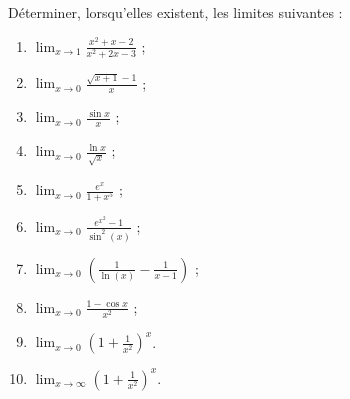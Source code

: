 
\begin{exercice}[\minsyndical]\label{exoTD2-1}
  
Déterminer, lorsqu'elles existent, les limites suivantes :
\begin{enumerate}
  \item
    $\displaystyle \lim_{x\to 1}\frac{x^2+x-2}{x^2+2x-3}$ ;
    \item
      $\displaystyle \lim_{x\to 0}\frac{\sqrt{x+1}-1}{x}$ ;
      \item
        $\displaystyle \lim_{x\to 0}\frac{\sin x}{x}$ ;
        \item
          $\displaystyle \lim_{x\to 0}\frac{\ln x}{\sqrt{x}}$ ;
          \item
            $\displaystyle \lim_{x\to 0}\frac{e^x}{1+x^5}$ ;
            \item
              $\displaystyle \lim_{x\to 0}\frac{e^{x^2}-1}{\sin^2 (x)}$ ;
              \item
                $\displaystyle \lim_{x\to 0}\left(\frac{1}{\ln (x)}-\frac{1}{x-1}\right)$ ;
    \item
        $\displaystyle \lim_{x\to 0}\frac{1-\cos x}{x^2}$ ;
    \item
        $\displaystyle \lim_{x\to 0}\left(1+ \frac{1}{x^2}\right)^x$. 
    \item   \label{ExobgEPck}
        $\displaystyle \lim_{x\to \infty}\left(1+ \frac{1}{x^2}\right)^x$. 
\end{enumerate}


\end{exercice}
